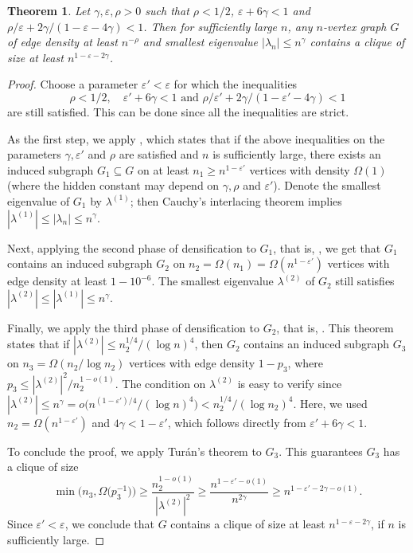 \documentclass[11pt]{article}
\theoremstyle{plain}
\newtheorem{theorem}{Theorem}[section]
\theoremstyle{definition}
\newcommand{\eps}{\varepsilon}
\begin{document}
\begin{theorem}\label{thm:clique1}
Let $\gamma,\eps,\rho > 0$ such that $\rho< 1/2$, $\eps+6\gamma<1$ and $\rho/\eps+ 2\gamma/(1-\eps-4\gamma) < 1$. Then for sufficiently large $n$, any $n$-vertex graph $G$ of edge density at least $n^{-\rho}$ and smallest eigenvalue $|\lambda_n|\leq n^{\gamma}$ contains a clique of size at least $n^{1-\eps - 2\gamma}$.
\end{theorem}
\begin{proof}
    Choose a parameter $\eps'<\eps$ for which the inequalities $$\rho< 1/2,\quad \eps'+6\gamma<1 \text{\ \ and\ \ } \rho/\eps'+ 2\gamma/(1-\eps'-4\gamma) < 1$$ are still satisfied. 
    This can be done since all the inequalities are strict.
    
    As the first step, we apply , which states that if the above inequalities on the parameters $\gamma, \eps'$ and $\rho$ are satisfied and $n$ is sufficiently large, there exists an induced subgraph $G_1\subseteq G$ on at least $n_1\geq n^{1-\eps'}$ vertices with density $\Omega(1)$ (where the hidden constant may depend on $\gamma, \rho$ and $\eps'$). 
    Denote the smallest eigenvalue of $G_1$ by $\lambda^{(1)}$; then Cauchy's interlacing theorem implies $|\lambda^{(1)}|\leq |\lambda_n|\leq n^{\gamma}$.
    
    Next, applying the second phase of densification to $G_1$, that is, , we get that $G_1$ contains an induced subgraph $G_2$ on  $n_2= \Omega(n_1)= \Omega(n^{1-\eps'})$ vertices with edge density at least $1-10^{-6}$. 
    The smallest eigenvalue $\lambda^{(2)}$ of $G_2$ still satisfies $|\lambda^{(2)}|\leq |\lambda^{(1)}|\leq n^{\gamma}$.
    
    Finally, we apply the third phase of densification to $G_2$, that is, .
    This theorem states that if $|\lambda^{(2)}|\leq n_2^{1/4}/(\log n)^4$, then $G_2$ contains an induced subgraph $G_3$ on $n_3=\Omega(n_2/\log n_2)$ vertices with edge density $1-p_3$, where $p_3\le |\lambda^{(2)}|^2/n_2^{1-o(1)}$. 
    The condition on $\lambda^{(2)}$ is easy to verify since $|\lambda^{(2)}|\leq n^{\gamma}= o\big(n^{(1-\eps')/4}/(\log n)^4\big) <  n_2^{1/4}/(\log n_2)^4$. 
    Here, we used $n_2=\Omega(n^{1-\eps'})$ and $4\gamma < 1-\eps'$, which follows directly from $\eps'+6\gamma<1$. 
    
    To conclude the proof, we apply Tur\'an's theorem to $G_3$. 
    This guarantees $G_3$ has a clique of size $$\min\Big(n_3,\Omega\big(p_3^{-1}\big)\Big)
        \ge \frac{n_2^{1-o(1)}}{|\lambda^{(2)}|^2}
        \geq \frac{n^{1-\eps'-o(1)}}{n^{2\gamma}}
        \geq n^{1-\eps'-2\gamma-o(1)}.$$
    Since $\eps'<\eps$, we conclude that $G$ contains a clique of size at least $n^{1-\eps-2\gamma}$, if $n$ is sufficiently large.
\end{proof}
\end{document}
